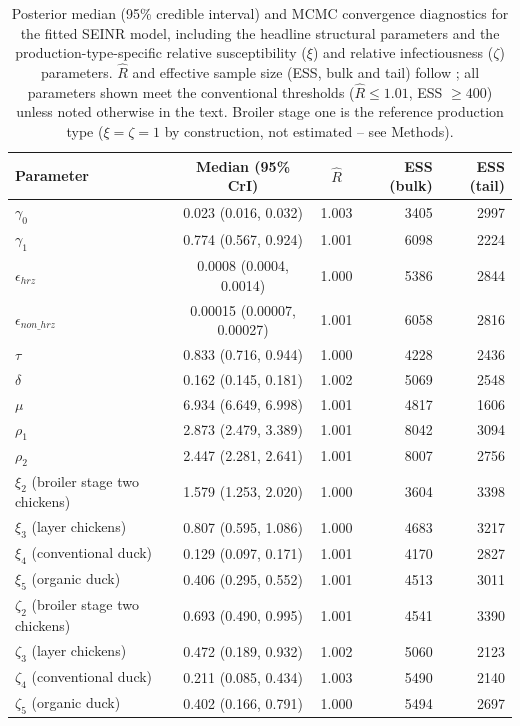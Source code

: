 \begin{table}[t]
\centering
\caption{Posterior median (95\% credible interval) and MCMC convergence diagnostics for the fitted SEINR model, including the headline structural parameters and the production-type-specific relative susceptibility ($\xi$) and relative infectiousness ($\zeta$) parameters. $\hat{R}$ and effective sample size (ESS, bulk and tail) follow \citet{vehtari2021rank}; all parameters shown meet the conventional thresholds ($\hat{R} \le 1.01$, ESS $\ge 400$) unless noted otherwise in the text. Broiler stage one is the reference production type ($\xi = \zeta = 1$ by construction, not estimated -- see Methods).}
\label{tab:parameter_fits}
\begin{tabular}{lccrr}
\toprule
Parameter & Median (95\% CrI) & $\hat{R}$ & ESS (bulk) & ESS (tail) \\
\midrule
$\gamma_0$ & 0.023 (0.016, 0.032) & 1.003 & 3405 & 2997 \\
$\gamma_1$ & 0.774 (0.567, 0.924) & 1.001 & 6098 & 2224 \\
$\epsilon_{hrz}$ & 0.0008 (0.0004, 0.0014) & 1.000 & 5386 & 2844 \\
$\epsilon_{non\_hrz}$ & 0.00015 (0.00007, 0.00027) & 1.001 & 6058 & 2816 \\
$\tau$ & 0.833 (0.716, 0.944) & 1.000 & 4228 & 2436 \\
$\delta$ & 0.162 (0.145, 0.181) & 1.002 & 5069 & 2548 \\
$\mu$ & 6.934 (6.649, 6.998) & 1.001 & 4817 & 1606 \\
$\rho_1$ & 2.873 (2.479, 3.389) & 1.001 & 8042 & 3094 \\
$\rho_2$ & 2.447 (2.281, 2.641) & 1.001 & 8007 & 2756 \\
$\xi_2$ (broiler stage two chickens) & 1.579 (1.253, 2.020) & 1.000 & 3604 & 3398 \\
$\xi_3$ (layer chickens) & 0.807 (0.595, 1.086) & 1.000 & 4683 & 3217 \\
$\xi_4$ (conventional duck) & 0.129 (0.097, 0.171) & 1.001 & 4170 & 2827 \\
$\xi_5$ (organic duck) & 0.406 (0.295, 0.552) & 1.001 & 4513 & 3011 \\
$\zeta_2$ (broiler stage two chickens) & 0.693 (0.490, 0.995) & 1.001 & 4541 & 3390 \\
$\zeta_3$ (layer chickens) & 0.472 (0.189, 0.932) & 1.002 & 5060 & 2123 \\
$\zeta_4$ (conventional duck) & 0.211 (0.085, 0.434) & 1.003 & 5490 & 2140 \\
$\zeta_5$ (organic duck) & 0.402 (0.166, 0.791) & 1.000 & 5494 & 2697 \\
\bottomrule
\end{tabular}
\end{table}

